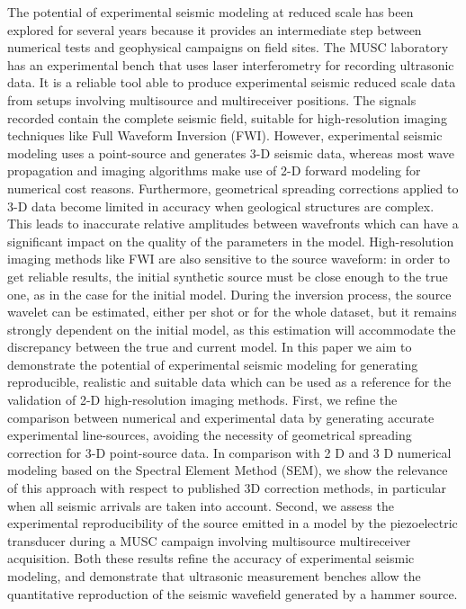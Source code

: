 \documentclass[paper,extra]{gji} %
\newcommand{\twod}{2-D }
\newcommand{\thrd}{3-D }
\begin{document}
\begin{summary}

\noindent The potential of experimental seismic modeling at reduced scale has been explored for several years because it provides an intermediate step between numerical tests and geophysical campaigns on field sites. The MUSC laboratory has an experimental bench that uses laser interferometry for recording ultrasonic data. It is a reliable tool able to produce experimental seismic reduced scale data from setups involving multisource and multireceiver positions. The signals recorded contain the complete seismic field, suitable for high-resolution imaging techniques like Full Waveform Inversion (FWI). However, experimental seismic modeling uses a point-source and generates 3-D seismic data, whereas most wave propagation and imaging algorithms make use of \twod forward modeling for numerical cost reasons. Furthermore, geometrical spreading corrections applied to \thrd data become limited in accuracy when geological structures are complex. This leads to inaccurate relative amplitudes between wavefronts which can have a significant impact on the quality of the parameters in the model. High-resolution imaging methods like FWI are also sensitive to the source waveform: in order to get reliable results, the initial synthetic source must be close enough to the true one, as in the case for the initial model. During the inversion process, the source wavelet can be estimated, either per shot or for the whole dataset, but it remains strongly dependent on the initial model, as this estimation will accommodate the discrepancy between the true and current model. In this paper we aim to demonstrate the potential of experimental seismic modeling for generating reproducible, realistic and suitable data which can be used as a reference for the validation of \twod high-resolution imaging methods. First, we refine the comparison between numerical and experimental data by generating accurate experimental line-sources, avoiding the necessity of geometrical spreading correction for \thrd point-source data. In comparison with 2 D and 3 D numerical modeling based on the Spectral Element Method (SEM), we show the relevance of this approach with respect to published 3D correction methods, in particular when all seismic arrivals are taken into account. Second, we assess the experimental reproducibility of the source emitted in a model by the piezoelectric transducer during a MUSC campaign involving multisource multireceiver acquisition. Both these results refine the accuracy of experimental seismic modeling, and demonstrate that ultrasonic measurement benches allow the quantitative reproduction of the seismic wavefield generated by a hammer source. 

\end{summary}
\end{document}
